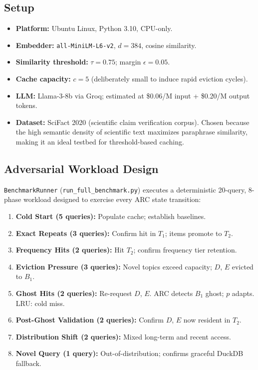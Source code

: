 \documentclass[conference,10pt]{IEEEtran}
\begin{document}
\subsection{Setup}

\begin{itemize}
  \item \textbf{Platform:} Ubuntu Linux, Python 3.10, CPU-only.
  \item \textbf{Embedder:} \texttt{all-MiniLM-L6-v2}, $d=384$, cosine similarity.
  \item \textbf{Similarity threshold:} $\tau = 0.75$; margin $\epsilon = 0.05$.
  \item \textbf{Cache capacity:} $c=5$ (deliberately small to induce rapid eviction cycles).
  \item \textbf{LLM:} Llama-3-8b via Groq; estimated at \$0.06/M input + \$0.20/M output tokens.
  \item \textbf{Dataset:} SciFact 2020 (scientific claim verification corpus). Chosen because the high semantic density of scientific text maximizes paraphrase similarity, making it an ideal testbed for threshold-based caching.
\end{itemize}

\subsection{Adversarial Workload Design}

\texttt{BenchmarkRunner} (\texttt{run\_full\_benchmark.py}) executes a deterministic 20-query, 8-phase workload designed to exercise every ARC state transition:

\begin{enumerate}
  \item \textbf{Cold Start (5 queries):} Populate cache; establish baselines.
  \item \textbf{Exact Repeats (3 queries):} Confirm hit in $T_1$; items promote to $T_2$.
  \item \textbf{Frequency Hits (2 queries):} Hit $T_2$; confirm frequency tier retention.
  \item \textbf{Eviction Pressure (3 queries):} Novel topics exceed capacity; $D$, $E$ evicted to $B_1$.
  \item \textbf{Ghost Hits (2 queries):} Re-request $D$, $E$. ARC detects $B_1$ ghost; $p$ adapts. LRU: cold miss.
  \item \textbf{Post-Ghost Validation (2 queries):} Confirm $D$, $E$ now resident in $T_2$.
  \item \textbf{Distribution Shift (2 queries):} Mixed long-term and recent access.
  \item \textbf{Novel Query (1 query):} Out-of-distribution; confirms graceful DuckDB fallback.
\end{enumerate}
\end{document}
